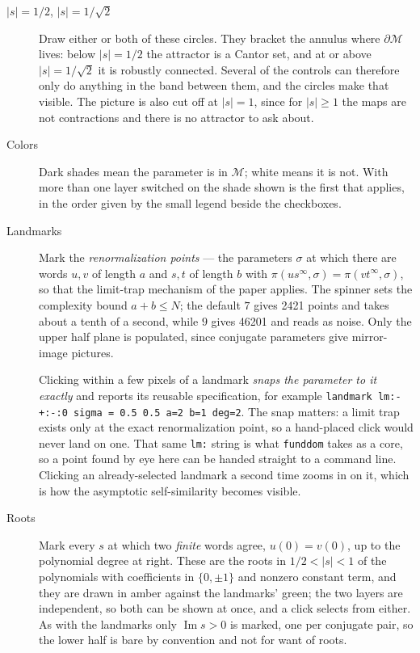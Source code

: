 \documentclass{amsart}
\begin{document}
\begin{description}
\item[$|s| = 1/2$, $|s| = 1/\sqrt2$] Draw either or both of these circles.  They bracket the
annulus where $\partial\mathcal{M}$ lives: below $|s| = 1/2$ the attractor is a Cantor set, and
at or above $|s| = 1/\sqrt2$ it is robustly connected.  Several of the controls can therefore
only do anything in the band between them, and the circles make that visible.  The picture is
also cut off at $|s| = 1$, since for $|s| \ge 1$ the maps are not contractions and there is no
attractor to ask about.
\item[Colors] Dark shades mean the parameter is in $\mathcal{M}$; white means it is not.  With
more than one layer switched on the shade shown is the first that applies, in the order given by
the small legend beside the checkboxes.
\item[Landmarks] Mark the \emph{renormalization points} --- the parameters $\sigma$ at which
there are words $u,v$ of length $a$ and $s,t$ of length $b$ with
$\pi(u s^\infty, \sigma) = \pi(v t^\infty, \sigma)$, so that the limit-trap mechanism of the
paper applies.  The spinner sets the complexity bound $a + b \le N$; the default $7$ gives 2421
points and takes about a tenth of a second, while $9$ gives 46201 and reads as noise.  Only the
upper half plane is populated, since conjugate parameters give mirror-image pictures.

Clicking within a few pixels of a landmark \emph{snaps the parameter to it exactly} and reports
its reusable specification, for example
\texttt{landmark lm:-+:-:0  sigma = 0.5 0.5  a=2 b=1 deg=2}.  The snap matters: a limit trap
exists only at the exact renormalization point, so a hand-placed click would never land on one.
That same \texttt{lm:} string is what \texttt{funddom} takes as a core, so a point found by eye
here can be handed straight to a command line.  Clicking an already-selected landmark a second
time zooms in on it, which is how the asymptotic self-similarity becomes visible.
\item[Roots] Mark every $s$ at which two \emph{finite} words agree, $u(0) = v(0)$, up to the
polynomial degree at right.  These are the roots in $1/2 < |s| < 1$ of the polynomials with
coefficients in $\{0,\pm 1\}$ and nonzero constant term, and they are drawn in amber against
the landmarks' green; the two layers are independent, so both can be shown at once, and a
click selects from either.  As with the landmarks only $\operatorname{Im} s > 0$ is marked, one
per conjugate pair, so the lower half is bare by convention and not for want of roots.


\end{description}
\end{document}
